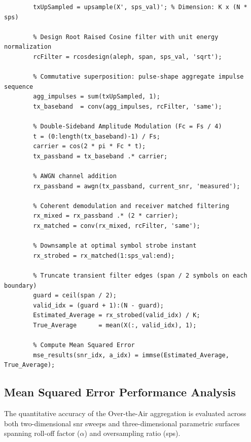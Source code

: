 \documentclass[Markos_Delaportas_1316.tex]{subfiles}
\begin{document}
    \begin{lstlisting}[style=Matlab-editor, caption={MATLAB multi-rate script for OTA computation with matched RRC filtering and coherent AM.}, label={lst:ml_rrc_fc}]
        % Multi-Rate OTA Computation with Matched RRC and AM
        txUpSampled = upsample(X', sps_val)'; % Dimension: K x (N * sps)

        % Design Root Raised Cosine filter with unit energy normalization
        rcFilter = rcosdesign(aleph, span, sps_val, 'sqrt');

        % Commutative superposition: pulse-shape aggregate impulse sequence
        agg_impulses = sum(txUpSampled, 1);
        tx_baseband  = conv(agg_impulses, rcFilter, 'same');

        % Double-Sideband Amplitude Modulation (Fc = Fs / 4)
        t = (0:length(tx_baseband)-1) / Fs;
        carrier = cos(2 * pi * Fc * t);
        tx_passband = tx_baseband .* carrier;

        % AWGN channel addition
        rx_passband = awgn(tx_passband, current_snr, 'measured');

        % Coherent demodulation and receiver matched filtering
        rx_mixed = rx_passband .* (2 * carrier);
        rx_matched = conv(rx_mixed, rcFilter, 'same');

        % Downsample at optimal symbol strobe instant
        rx_strobed = rx_matched(1:sps_val:end);

        % Truncate transient filter edges (span / 2 symbols on each boundary)
        guard = ceil(span / 2);
        valid_idx = (guard + 1):(N - guard);
        Estimated_Average = rx_strobed(valid_idx) / K;
        True_Average      = mean(X(:, valid_idx), 1);

        % Compute Mean Squared Error
        mse_results(snr_idx, a_idx) = immse(Estimated_Average, True_Average);
    \end{lstlisting}

\subsection{Mean Squared Error Performance Analysis}
\label{subsec:mse_analysis}
The quantitative accuracy of the Over-the-Air aggregation is
evaluated across both two-dimensional \gls{snr} sweeps and
three-dimensional parametric surfaces spanning roll-off factor
($\alpha$) and oversampling ratio (\gls{sps}).
\end{document}
